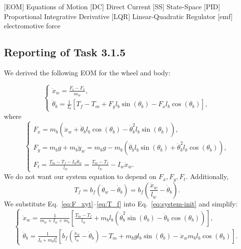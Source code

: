 \documentclass[11pt]{article} %
\begin{document}
\begin{acronym}[TDMA]
		[EOM]	{Equations of Motion}
		[DC]	{Direct Current}
		[SS]	{State-Space}
		[PID]	{Proportional Integrative Derivative}
		[LQR]	{Linear-Quadratic Regulator}
		[emf]	{electromotive force}
\end{acronym}

\subsection*{Reporting of Task 3.1.5}
We derived the following \ac{EOM} for the wheel and body:

\begin{equation}\label{eq:system-init}
  \begin{cases}
    \ddot{x}_w = \frac{F_t - F_x}{m_w}, \\[1em]
    \ddot{\theta}_b =
    \frac{1}{I_b}\left[
      T_f
      - T_m
      + F_y l_b \sin(\theta_b)
      - F_x l_b \cos(\theta_b)
    \right],
  \end{cases}
\end{equation}
where
\begin{equation}\label{eq:F_xyt}
  \begin{cases}
    F_x = m_b\left(
      \ddot{x}_w
      + \ddot{\theta}_b l_b \cos(\theta_b)
      - \dot{\theta}^2_b l_b \sin(\theta_b)
    \right), \\[1em]
    F_y = m_b g+ m_b \ddot{y}_w = m_b g - m_b\left(
      \ddot{\theta}_b l_b \sin(\theta_b)
      + \dot{\theta}^2_b l_b \cos(\theta_b)
    \right), \\[1em]
    F_t = \frac{T_m - T_f - I_w \ddot{\theta}_w}{l_w} = \frac{T_m - T_f}{l_w} - I_w \ddot{x}_w.
  \end{cases}
\end{equation}
We do not want our system equation to depend on $F_x, F_y, F_t$.
Additionally,
\begin{equation}\label{eq:T_f}
T_f = b_f\left(
\dot{\theta}_w - \dot{\theta}_b
\right) =
b_f\left(
\frac{\dot{x}_w}{l_w} - \dot{\theta}_b
\right).
\end{equation}
We substitute Eq.~\eqref{eq:F_xyt}--\eqref{eq:T_f} into Eq.~\eqref{eq:system-init} and simplify:
\begin{equation}\label{eq:system}
  \begin{cases}
    \ddot{x}_w = \frac{1}{m_w + I_w + m_b}\left[
      \frac{T_m - T_f}{l_w}
      + m_b l_b \left(\dot{\theta}^2_b \sin(\theta_b)
        - \ddot{\theta}_b \cos(\theta_b)
      \right)
    \right], \\[1em]
    \ddot{\theta}_b = \frac{1}{I_b + m_b l_b^2}\left[
      b_f\left(\frac{\dot{x}_w}{l_w}
        - \dot{\theta}_b\right)
      - T_m
      + m_b g l_b \sin(\theta_b)
      - \ddot{x}_w m_b l_b \cos(\theta_b)
    \right].
  \end{cases}
\end{equation}
\end{document}

